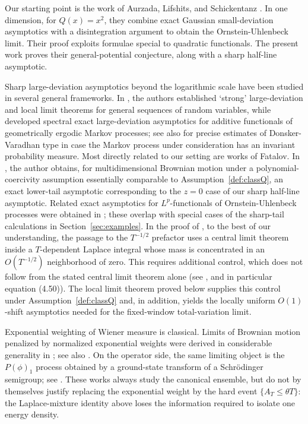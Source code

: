 \documentclass[11pt,reqno]{amsart}
\theoremstyle{definition}
\numberwithin{equation}{section}
\newcommand{\<}{\langle}
\renewcommand{\>}{\rangle}
\begin{document}
Our starting point is the work of Aurzada, Lifshits, and Schickentanz
\cite{ALS}.  In one dimension, for $Q(x)=x^2$, they combine exact
Gaussian small-deviation asymptotics with a disintegration argument to obtain
the Ornstein-Uhlenbeck limit.  Their proof exploits formulae special to
quadratic functionals.  The present work proves their general-potential
conjecture, along with a sharp half-line asymptotic.

Sharp large-deviation asymptotics beyond the logarithmic scale have been
studied in several general frameworks.  In
\cite{ChagantySethuraman}, the authors established `strong' large-deviation and local limit
theorems for general sequences of random variables, while  \cite{KontoyiannisMeyn} developed spectral exact large-deviation
asymptotics for additive functionals of geometrically ergodic Markov
processes; see also \cite{KusuokaTamura} for precise
estimates of Donsker-Varadhan type in case the Markov process under consideration has an invariant probability measure.  
Most directly related to our setting are works of Fatalov. In \cite{Fatalov}, the author obtains, for multidimensional
Brownian motion under a polynomial-coercivity assumption essentially
comparable to Assumption~\ref{def:classQ}, an exact lower-tail asymptotic
corresponding to the  $z=0 $ case of our sharp half-line asymptotic.
Related exact asymptotics for  $L^p $-functionals of
Ornstein-Uhlenbeck processes were obtained in
\cite{FatalovOU}; these overlap with special cases of the sharp-tail
calculations in Section~\ref{sec:examples}.
In the proof of \cite{Fatalov}, to the best of our understanding, the passage to the
 $T^{-1/2} $ prefactor uses a central limit theorem inside a
 $T $-dependent Laplace integral whose mass is concentrated in an
 $O(T^{-1/2}) $ neighborhood of zero. This requires additional control, which does not follow from the stated central
limit theorem alone (see \cite[Lemma $4.8$]{Fatalov}, and in particular equation (4.50)). The local limit theorem proved below supplies
this control under Assumption~\ref{def:classQ} and, in addition, yields the locally
uniform  $O(1) $-shift asymptotics needed for the fixed-window
total-variation limit.

Exponential weighting of Wiener measure is classical. Limits of Brownian motion penalized by normalized exponential weights were derived in considerable generality in \cite{RoynetteValloisYor}; see also
\cite{LHB20}.  On the operator side, the same limiting object
is the $P(\phi)_1$ process obtained by a ground-state transform of a
Schr\"odinger semigroup; see  \cite{Simon79,RosenSimon}.  These works always study the canonical ensemble, but do not by themselves justify replacing the exponential weight by the hard event $\{ A_T\leq\theta T\}$: the Laplace-mixture identity above loses the information required to isolate one energy density.
\end{document}
